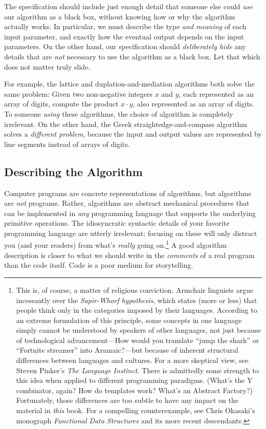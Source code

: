The specification should include just enough detail that someone else could \textit{use} our algorithm as a black box, without knowing how or why the algorithm actually works. In particular, we must describe the type \textit{and meaning} of each input parameter, and exactly how the eventual output depends on the input parameters. On the other hand, our specification should \textit{deliberately hide} any details that are \textit{not} necessary to use the algorithm as a black box. Let that which does not matter truly slide.

For example, the lattice and duplation-and-mediation algorithms both solve the same problem: Given two non-negative integers $x$ and $y$, each represented as an array of digits, compute the product $x \cdot y$, also represented as an array of digits. To someone \textit{using} these algorithms, the choice of algorithm is completely irrelevant. On the other hand, the Greek straightedge-and-compass algorithm solves a \textit{different problem}, because the input and output values are represented by line segments instead of arrays of digits.

\subsection{Describing the Algorithm}
Computer programs are concrete representations of algorithms, but algorithms are \textit{not} programs. Rather, algorithms are abstract mechanical procedures that can be implemented in \textit{any} programming language that supports the underlying primitive operations. The idiosyncratic syntactic details of your favorite programming language are utterly irrelevant; focusing on these will only distract you (and your readers) from what’s \textit{really} going on.\footnote{This is, of course, a matter of religious conviction. Armchair linguists argue incessantly over the \textit{Sapir-Whorf hypothesis}, which states (more or less) that people think only in the categories imposed by their languages. According to an extreme formulation of this principle, some concepts in one language simply cannot be understood by speakers of other languages, not just because of technological advancement—How would you translate “jump the shark” or “Fortnite streamer” into Aramaic?—but because of inherent structural differences between languages and cultures. For a more skeptical view, see Steven Pinker’s \textit{The Language Instinct}. There is admittedly some strength to this idea when applied to different programming paradigms. (What’s the Y combinator, again? How do templates work? What’s an Abstract Factory?) Fortunately, those differences are too subtle to have any impact on the material in \textit{this} book. For a compelling counterexample, see Chris Okasaki’s monograph \textit{Functional Data Structures} and its more recent descendants.} A good algorithm description is closer to what we should write in the \textit{comments} of a real program than the code itself. Code is a poor medium for storytelling.

